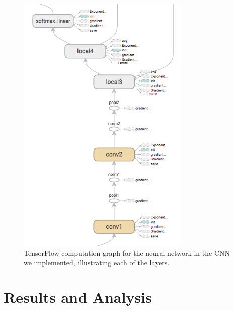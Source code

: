 \documentclass[11pt, twocolumn, twoside]{article}
\begin{document}
\begin{figure}
	\centering
	\includegraphics[width=3.25in]{inference_graph}
	\caption{TensorFlow computation graph for the neural network in the CNN we implemented, illustrating each of the layers.}
	\label{fig:inference}
\end{figure}

\section{Results and Analysis}
\end{document}
